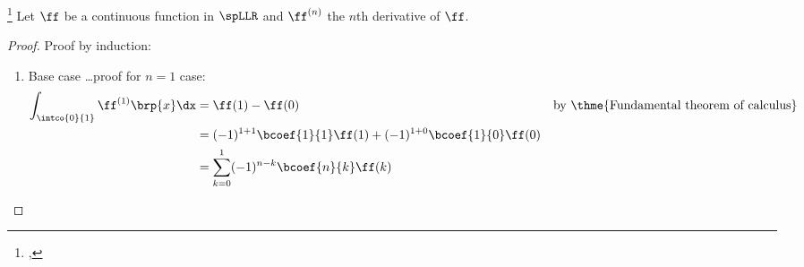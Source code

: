 \begin{theorem}
\footnote{
  ,
  }
\label{thm:int01}
Let $\ff$ be a continuous function in $\spLLR$ and $\ff^{(n)}$ the $n$th derivative of $\ff$.
\end{theorem}
\begin{proof}
Proof by induction:
  \begin{enumerate}
    \item Base case \ldots proof for $n=1$ case:
      \begin{align*}
        \int_\intco{0}{1} \ff^{(1)}\brp{x} \dx
          &= \ff(1)-\ff(0)
          && \text{by \thme{Fundamental theorem of calculus}}
        \\&= (-1)^{1+1}\bcoef{1}{1}\ff(1) + (-1)^{1+0}\bcoef{1}{0}\ff(0)
        \\&= \sum_{k=0}^1 (-1)^{n-k}\bcoef{n}{k}\ff(k)
      \end{align*}


\end{enumerate}
\end{proof}
